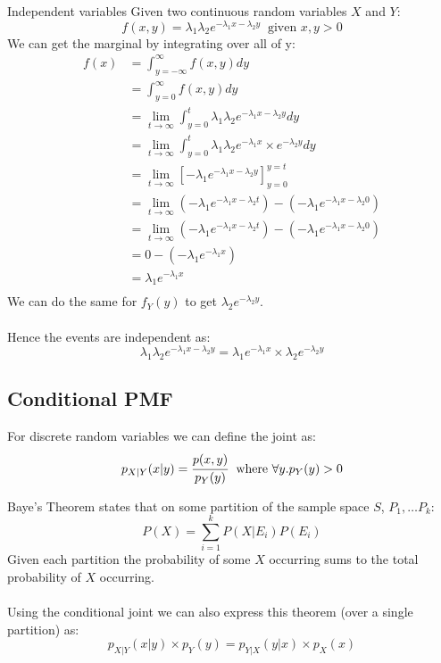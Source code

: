 \begin{examplebox}{Independent variables}
	Given two continuous random variables $X$ and $Y$:
	\[f(x,y) = \lambda_1\lambda_2 e^{-\lambda_1 x - \lambda_2 y} \ \text{ given } x,y > 0\]
	We can get the marginal  by integrating over all of y:
	\[\begin{split}
			f(x) & = \int_{y = -\infty}^{\infty} f(x,y) dy \\
			& = \int_{y = 0}^{\infty} f(x,y) dy \\
			& = \lim_{t \to \infty}\int_{y = 0}^{t} \lambda_1 \lambda_2 e^{- \lambda_1 x - \lambda_2 y} dy \\
			& = \lim_{t \to \infty}\int_{y = 0}^{t} \lambda_1 \lambda_2 e^{- \lambda_1 x} \times e^{- \lambda_2 y} dy \\
			& = \lim_{t \to \infty}\left[ -\lambda_1e^{-\lambda_1 x - \lambda_2 y} \right]_{y=0}^{y=t} \\
			& = \lim_{t \to \infty}\left( -\lambda_1e^{-\lambda_1 x - \lambda_2 t} \right) - \left( -\lambda_1e^{-\lambda_1 x - \lambda_2 0} \right)\\
			& = \lim_{t \to \infty}\left( -\lambda_1e^{-\lambda_1 x - \lambda_2 t} \right) - \left( -\lambda_1e^{-\lambda_1 x - \lambda_2 0} \right)\\
			& = 0 - \left( -\lambda_1e^{-\lambda_1 x} \right)\\
			& = \lambda_1e^{-\lambda_1 x}\\
		\end{split}\]
	We can do the same for $f_Y(y)$ to get $ \lambda_2e^{-\lambda_2 y}$.
	\\
	\\ Hence the events are independent as:
	\[\lambda_1\lambda_2 e^{-\lambda_1 x - \lambda_2 y} = \lambda_1e^{-\lambda_1 x} \times \lambda_2e^{-\lambda_2 y} \]
\end{examplebox}

\subsection{Conditional PMF}
For discrete random variables we can define the joint  as:
\[p_{X | Y}(x | y) = \cfrac{p(x,y)}{p_Y(y)} \ \text{ where } \forall y. p_Y(y) > 0\]
\begin{definitionbox}{Baye's Theorem}
	 states that on some partition of the sample space $S$, $P_1, \dots P_k$:
	\[P(X) = \sum_{i = 1}^k P(X|E_i)P(E_i)\]
	Given each partition the probability of some $X$ occurring sums to the total probability of $X$ occurring.
	\\
	\\ Using the conditional joint  we can also express this theorem (over a single partition) as:
	\[p_{X|Y}(x|y) \times p_Y(y)= p_{Y|X}(y|x) \times p_X(x)\]
\end{definitionbox}


